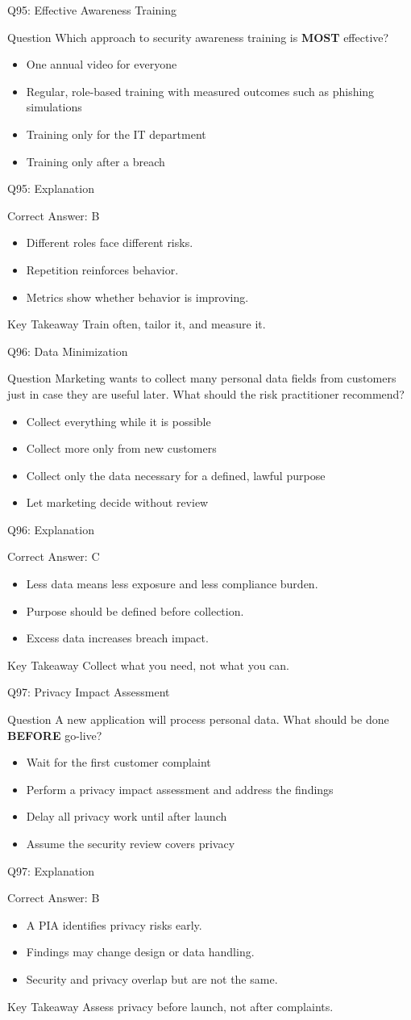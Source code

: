 \documentclass[aspectratio=169]{beamer}
\newcommand{\hq}[7]{%
	\begin{frame}{Q#1: #2}
		\begin{block}{Question}
			#3
		\end{block}
		\begin{itemize}
			#4
		\end{itemize}
	\end{frame}
	\begin{frame}{Q#1: Explanation}
		\begin{block}{Correct Answer: #5}
			\begin{itemize}
				#6
			\end{itemize}
		\end{block}
		\begin{alertblock}{Key Takeaway}
			#7
		\end{alertblock}
	\end{frame}
}
\begin{document}
	\hq{95}{Effective Awareness Training}
	{Which approach to security awareness training is \textbf{MOST} effective?}
	{\item[\textbf{(A)}] One annual video for everyone
		\item[\textbf{(B)}] Regular, role-based training with measured outcomes such as phishing simulations
		\item[\textbf{(C)}] Training only for the IT department
		\item[\textbf{(D)}] Training only after a breach}
	{B}
	{\item Different roles face different risks.
		\item Repetition reinforces behavior.
		\item Metrics show whether behavior is improving.}
	{Train often, tailor it, and measure it.}
	
	\hq{96}{Data Minimization}
	{Marketing wants to collect many personal data fields from customers just in case they are useful later. What should the risk practitioner recommend?}
	{\item[\textbf{(A)}] Collect everything while it is possible
		\item[\textbf{(B)}] Collect more only from new customers
		\item[\textbf{(C)}] Collect only the data necessary for a defined, lawful purpose
		\item[\textbf{(D)}] Let marketing decide without review}
	{C}
	{\item Less data means less exposure and less compliance burden.
		\item Purpose should be defined before collection.
		\item Excess data increases breach impact.}
	{Collect what you need, not what you can.}
	
	\hq{97}{Privacy Impact Assessment}
	{A new application will process personal data. What should be done \textbf{BEFORE} go-live?}
	{\item[\textbf{(A)}] Wait for the first customer complaint
		\item[\textbf{(B)}] Perform a privacy impact assessment and address the findings
		\item[\textbf{(C)}] Delay all privacy work until after launch
		\item[\textbf{(D)}] Assume the security review covers privacy}
	{B}
	{\item A PIA identifies privacy risks early.
		\item Findings may change design or data handling.
		\item Security and privacy overlap but are not the same.}
	{Assess privacy before launch, not after complaints.}
	
\end{document}
